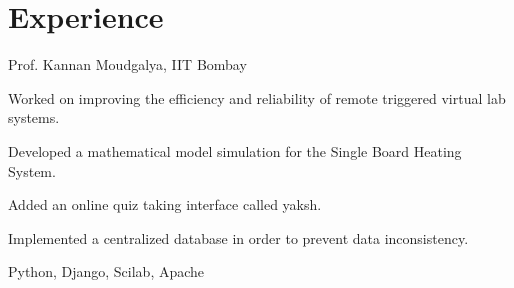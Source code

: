 
\section{Experience}

\vspace{\topsep} %
\begin{tightemize}
\item {} Prof. Kannan Moudgalya, IIT Bombay
\item Worked on improving the efficiency and reliability of remote triggered virtual lab systems.
\item Developed a mathematical model simulation for the Single Board Heating System.
\item Added an online quiz taking interface called yaksh.
\item Implemented a centralized database in order to prevent data inconsistency.
\item {} Python, Django, Scilab, Apache
\end{tightemize}
\sectionsep
